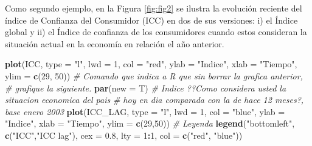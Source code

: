 \documentclass[
]{book}
\newenvironment{Shaded}{\begin{snugshade}}{\end{snugshade}}
\newcommand{\AttributeTok}[1]{\textcolor[rgb]{0.13,0.29,0.53}{#1}}
\newcommand{\CommentTok}[1]{\textcolor[rgb]{0.56,0.35,0.01}{\textit{#1}}}
\newcommand{\DecValTok}[1]{\textcolor[rgb]{0.00,0.00,0.81}{#1}}
\newcommand{\FloatTok}[1]{\textcolor[rgb]{0.00,0.00,0.81}{#1}}
\newcommand{\FunctionTok}[1]{\textcolor[rgb]{0.13,0.29,0.53}{\textbf{#1}}}
\newcommand{\NormalTok}[1]{#1}
\newcommand{\SpecialCharTok}[1]{\textcolor[rgb]{0.81,0.36,0.00}{\textbf{#1}}}
\newcommand{\StringTok}[1]{\textcolor[rgb]{0.31,0.60,0.02}{#1}}
\begin{document}
Como segundo ejemplo, en la Figura \ref{fig:fig2} se ilustra la evolución reciente del índice de Confianza del Consumidor (ICC) en dos de sus versiones: i) el Índice global y ii) el Índice de confianza de los consumidores cuando estos consideran la situación actual en la economía en relación el año anterior.

\begin{Shaded}
\begin{Highlighting}[]
\FunctionTok{plot}\NormalTok{(ICC, }\AttributeTok{type =} \StringTok{"l"}\NormalTok{, }\AttributeTok{lwd =} \DecValTok{1}\NormalTok{, }\AttributeTok{col =} \StringTok{"red"}\NormalTok{, }\AttributeTok{ylab =} \StringTok{"Indice"}\NormalTok{, }
     \AttributeTok{xlab =} \StringTok{"Tiempo"}\NormalTok{, }\AttributeTok{ylim =} \FunctionTok{c}\NormalTok{(}\DecValTok{29}\NormalTok{, }\DecValTok{50}\NormalTok{))}
\CommentTok{\# Comando que indica a R que sin borrar la grafica anterior, }
\CommentTok{\# grafique la siguiente.}
\FunctionTok{par}\NormalTok{(}\AttributeTok{new =}\NormalTok{ T) }
\CommentTok{\# Indice ??Como considera usted la situacion economica del pais }
\CommentTok{\# hoy en dia comparada con la de hace 12 meses?, base enero 2003}
\FunctionTok{plot}\NormalTok{(ICC\_LAG, }\AttributeTok{type =} \StringTok{"l"}\NormalTok{, }\AttributeTok{lwd =} \DecValTok{1}\NormalTok{, }\AttributeTok{col =} \StringTok{"blue"}\NormalTok{, }\AttributeTok{ylab =} \StringTok{"Indice"}\NormalTok{, }
     \AttributeTok{xlab =} \StringTok{"Tiempo"}\NormalTok{, }\AttributeTok{ylim =} \FunctionTok{c}\NormalTok{(}\DecValTok{29}\NormalTok{,}\DecValTok{50}\NormalTok{))}
\CommentTok{\# Leyenda}
\FunctionTok{legend}\NormalTok{(}\StringTok{"bottomleft"}\NormalTok{, }\FunctionTok{c}\NormalTok{(}\StringTok{"ICC"}\NormalTok{,}\StringTok{"ICC lag"}\NormalTok{), }\AttributeTok{cex =} \FloatTok{0.8}\NormalTok{, }\AttributeTok{lty =} \DecValTok{1}\SpecialCharTok{:}\DecValTok{1}\NormalTok{, }
       \AttributeTok{col =} \FunctionTok{c}\NormalTok{(}\StringTok{"red"}\NormalTok{, }\StringTok{"blue"}\NormalTok{))}
\end{Highlighting}
\end{Shaded}
\end{document}
